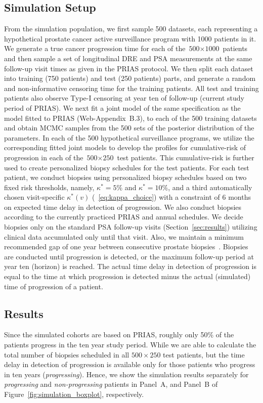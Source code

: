 \subsection{Simulation Setup}
From the simulation population, we first sample 500 datasets, each representing a hypothetical prostate cancer active surveillance program with 1000 patients in it. We generate a true cancer progression time for each of the ${\mbox{500} \times \mbox{1000}}$ patients and then sample a set of longitudinal DRE and PSA measurements at the same follow-up visit times as given in the PRIAS protocol. We then split each dataset into training (750 patients) and test (250 patients) parts, and generate a random and non‐informative censoring time for the training patients. All test and training patients also observe Type-I censoring at year ten of follow-up (current study period of PRIAS). We next fit a joint model of the same specification as the model fitted to PRIAS (Web-Appendix~B.3), to each of the 500 training datasets and obtain MCMC samples from the 500 sets of the posterior distribution of the parameters. In each of the 500 hypothetical surveillance programs, we utilize the corresponding fitted joint models to develop the profiles for cumulative-risk of progression in each of the ${\mbox{500} \times \mbox{250}}$ test patients. This cumulative-risk is further used to create personalized biopsy schedules for the test patients. For each test patient, we conduct biopsies using personalized biopsy schedules based on two fixed risk thresholds, namely, $\kappa^*=5\%$ and $\kappa^*=10\%$, and a third automatically chosen visit-specific $\kappa^*(v)$ (~\ref{eq:kappa_choice}) with a constraint of 6 months on expected time delay in detection of progression. We also conduct biopsies according to the currently practiced PRIAS and annual schedules. We decide biopsies only on the standard PSA follow-up visits (Section~\ref{sec:results}) utilizing clinical data accumulated only until that visit. Also, we maintain a minimum recommended gap of one year between consecutive prostate biopsies~\citep{bokhorst2015compliance}. Biopsies are conducted until progression is detected, or the maximum follow-up period at year ten (horizon) is reached. The actual time delay in detection of progression is equal to the time at which progression is detected minus the actual (simulated) time of progression of a patient.

\subsection{Results}
Since the simulated cohorts are based on PRIAS, roughly only 50\% of the patients progress in the ten year study period. While we are able to calculate the total number of biopsies scheduled in all $500 \times 250$ test patients, but the time delay in detection of progression is available only for those patients who progress in ten years (\textit{progressing}). Hence, we show the simulation results separately for \textit{progressing} and \textit{non-progressing} patients in Panel~A, and Panel~B of Figure~\ref{fig:simulation_boxplot}, respectively.

